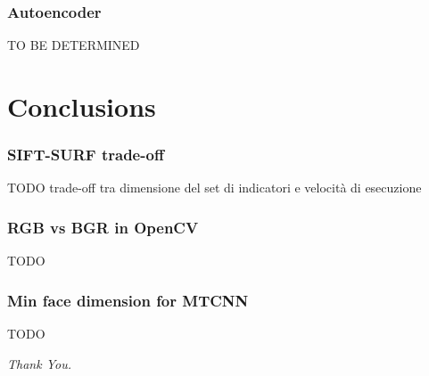 \documentclass{beamer}
\begin{document}
	\begin{frame}
		\frametitle{Autoencoder}
		TO BE DETERMINED
	\end{frame}
	
	\section{Conclusions}
	\begin{frame}
		\frametitle{SIFT-SURF trade-off}
		TODO trade-off tra dimensione del set di indicatori e velocità di esecuzione
	\end{frame}
	
	\begin{frame}
		\frametitle{RGB vs BGR in OpenCV}
		TODO
	\end{frame}
	
	\begin{frame}
		\frametitle{Min face dimension for MTCNN}
		TODO
	\end{frame}
	
	\begin{frame}
		\centering \Huge
		\emph{Thank You.}
	\end{frame}
\end{document}
